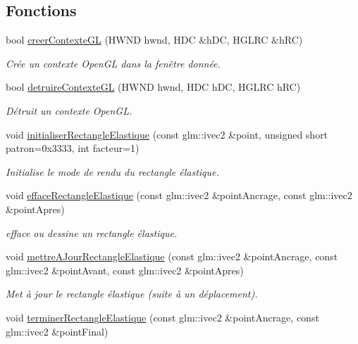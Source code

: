 \subsection*{Fonctions}
\begin{DoxyCompactItemize}
\item 
bool \hyperlink{namespaceaidegl_a465185be937173fdd623eb88949b212c}{creer\-Contexte\-G\-L} (H\-W\-N\-D hwnd, H\-D\-C \&h\-D\-C, H\-G\-L\-R\-C \&h\-R\-C)
\begin{DoxyCompactList}\small\item\em Crée un contexte Open\-G\-L dans la fenêtre donnée. \end{DoxyCompactList}\item 
bool \hyperlink{namespaceaidegl_a0cb31f11533480a059574970f5fcff6b}{detruire\-Contexte\-G\-L} (H\-W\-N\-D hwnd, H\-D\-C h\-D\-C, H\-G\-L\-R\-C h\-R\-C)
\begin{DoxyCompactList}\small\item\em Détruit un contexte Open\-G\-L. \end{DoxyCompactList}\item 
void \hyperlink{namespaceaidegl_a0680ab3e3bddc4c7b123c46117e31094}{initialiser\-Rectangle\-Elastique} (const glm\-::ivec2 \&point, unsigned short patron=0x3333, int facteur=1)
\begin{DoxyCompactList}\small\item\em Initialise le mode de rendu du rectangle élastique. \end{DoxyCompactList}\item 
void \hyperlink{namespaceaidegl_aeda079ddf58dff9c4ceb7b1dc756439b}{efface\-Rectangle\-Elastique} (const glm\-::ivec2 \&point\-Ancrage, const glm\-::ivec2 \&point\-Apres)
\begin{DoxyCompactList}\small\item\em efface ou dessine un rectangle élastique. \end{DoxyCompactList}\item 
void \hyperlink{namespaceaidegl_a900742dca102d07d9ae7efd8a5e0cce8}{mettre\-A\-Jour\-Rectangle\-Elastique} (const glm\-::ivec2 \&point\-Ancrage, const glm\-::ivec2 \&point\-Avant, const glm\-::ivec2 \&point\-Apres)
\begin{DoxyCompactList}\small\item\em Met à jour le rectangle élastique (suite à un déplacement). \end{DoxyCompactList}\item 
void \hyperlink{namespaceaidegl_a023f37325ede13a1f60243382cc11b12}{terminer\-Rectangle\-Elastique} (const glm\-::ivec2 \&point\-Ancrage, const glm\-::ivec2 \&point\-Final)

\end{DoxyCompactItemize}
